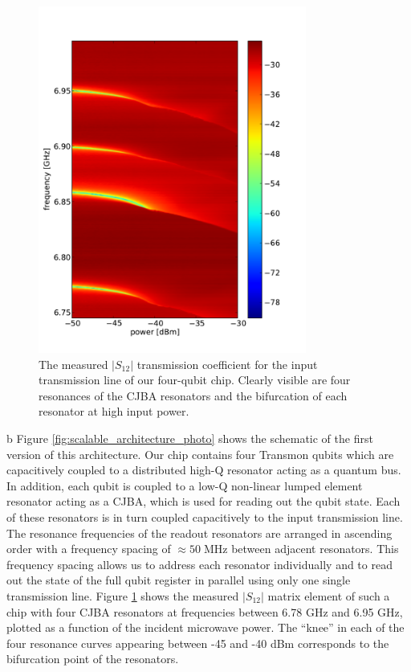 \begin{figure}
	\centering
	\includegraphics[width=8.8cm]{"./data/scalable architecture/jba spectroscopy/spectro"}
	\caption[Measured $|S_{12}|$ transmission coefficient for the input transmission line of our four-qubit chip]{The measured $|S_{12}|$ transmission coefficient for the input transmission line of our four-qubit chip. Clearly visible are four resonances of the CJBA resonators and the bifurcation of each resonator at high input power.}
	\label{fig:jba_multiplexed_spectroscopy}
\end{figure}
b
Figure \ref{fig:scalable_architecture_photo} shows the schematic of the first version of this architecture. Our chip contains four Transmon qubits which are capacitively coupled to a distributed high-Q resonator acting as a quantum bus. In addition, each qubit is coupled to a low-Q non-linear lumped element resonator acting as a CJBA, which is used for reading out the qubit state. Each of these resonators is in turn coupled capacitively to the input transmission line. The resonance frequencies of the readout resonators are arranged in ascending order with a frequency spacing of \mbox{$\approx 50\;\mathrm{MHz}$} between adjacent resonators. This frequency spacing allows us to address each resonator individually and to read out the state of the full qubit register in parallel using only one single transmission line. Figure \ref{fig:jba_multiplexed_spectroscopy} shows the measured $|S_{12}|$ matrix element of such a chip with four CJBA resonators at frequencies between 6.78 GHz and 6.95 GHz, plotted as a function of the incident microwave power. The ``knee'' in each of the four resonance curves appearing between -45 and -40 dBm corresponds to the bifurcation point of the resonators.


